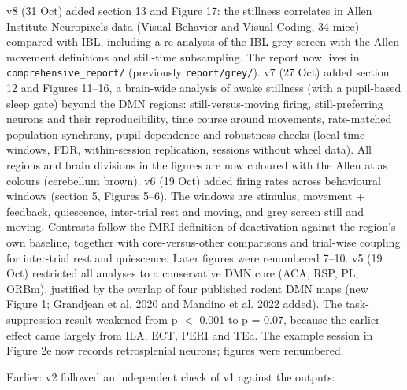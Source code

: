 \documentclass[10pt,a4paper]{article}
\begin{document}
\begin{tcolorbox}[breakable,colback=accent!8,colframe=accent,boxrule=0pt,leftrule=2pt,arc=0pt,fontupper=\small]
v8 (31 Oct) added section 13 and Figure 17: the stillness correlates in Allen Institute Neuropixels data (Visual Behavior and Visual Coding, 34 mice) compared with IBL, including a re-analysis of the IBL grey screen with the Allen movement definitions and still-time subsampling. The report now lives in \texttt{comprehensive\_\allowbreak{}report/\allowbreak{}} (previously \texttt{report/\allowbreak{}grey/\allowbreak{}}). v7 (27 Oct) added section 12 and Figures 11--16, a brain-wide analysis of awake stillness (with a pupil-based sleep gate) beyond the DMN regions: still-versus-moving firing, still-preferring neurons and their reproducibility, time course around movements, rate-matched population synchrony, pupil dependence and robustness checks (local time windows, FDR, within-session replication, sessions without wheel data). All regions and brain divisions in the figures are now coloured with the Allen atlas colours (cerebellum brown). v6 (19 Oct) added firing rates across behavioural windows (section 5, Figures 5--6). The windows are stimulus, movement + feedback, quiescence, inter-trial rest and moving, and grey screen still and moving. Contrasts follow the fMRI definition of deactivation against the region's own baseline, together with core-versus-other comparisons and trial-wise coupling for inter-trial rest and quiescence. Later figures were renumbered 7--10. v5 (19 Oct) restricted all analyses to a conservative DMN core (ACA, RSP, PL, ORBm), justified by the overlap of four published rodent DMN maps (new Figure 1; Grandjean et al. 2020 and Mandino et al. 2022 added). The task-suppression result weakened from p $<$ 0.001 to p = 0.07, because the earlier effect came largely from ILA, ECT, PERI and TEa. The example session in Figure 2e now records retrosplenial neurons; figures were renumbered.

Earlier: v2 followed an independent check of v1 against the outputs:


\end{tcolorbox}
\end{document}
